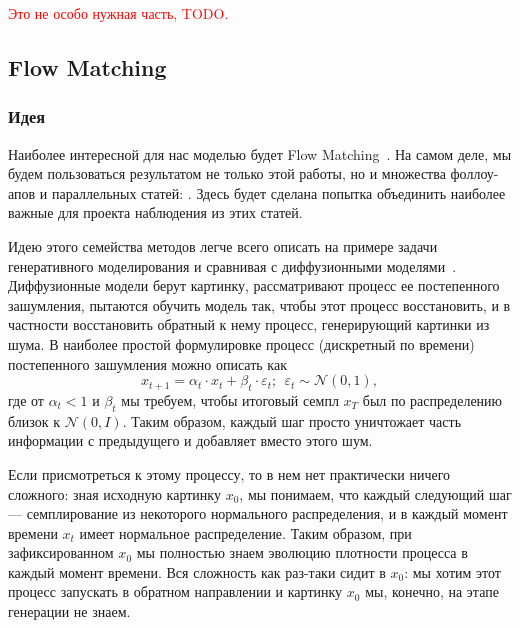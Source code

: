 \documentclass[12pt]{article}
\theoremstyle{definition}
\begin{document}
\textcolor{red}{Это не особо нужная часть, TODO.}

\subsection{Flow Matching}

\subsubsection{Идея}
Наиболее интересной для нас моделью будет Flow Matching~\cite{lipman2022flow}. На самом деле, мы будем пользоваться результатом не только этой работы, но и множества фоллоу-апов и параллельных статей: \cite{tong2023conditional, albergo2022building, albergo2023stochastic}. Здесь будет сделана попытка объединить наиболее важные для проекта наблюдения из этих статей.

Идею этого семейства методов легче всего описать на примере задачи генеративного моделирования и сравнивая с диффузионными моделями~\cite{ho2020denoising, song2020score}. Диффузионные модели берут картинку, рассматривают процесс ее постепенного зашумления, пытаются обучить модель так, чтобы этот процесс восстановить, и в частности восстановить обратный к нему процесс, генерирующий картинки из шума. В наиболее простой формулировке процесс (дискретный по времени) постепенного зашумления можно описать как
\[
    x_{t + 1} = \alpha_t \cdot x_t + \beta_t \cdot \varepsilon_t;\:\:
    \varepsilon_t \sim \mathcal{N}(0, 1),
\]
где от $\alpha_t < 1$ и $\beta_t$ мы требуем, чтобы итоговый семпл $x_T$ был по распределению близок к $\mathcal{N}(0, I)$. Таким образом, каждый шаг просто уничтожает часть информации с предыдущего и добавляет вместо этого шум.

Если присмотреться к этому процессу, то в нем нет практически ничего сложного: зная исходную картинку $x_0$, мы понимаем, что каждый следующий шаг --- семплирование из некоторого нормального распределения, и в каждый момент времени $x_t$ имеет нормальное распределение. Таким образом, при зафиксированном $x_0$ мы полностью знаем эволюцию плотности процесса в каждый момент времени. Вся сложность как раз-таки сидит в $x_0$: мы хотим этот процесс запускать в обратном направлении и картинку $x_0$ мы, конечно, на этапе генерации не знаем.
\end{document}

